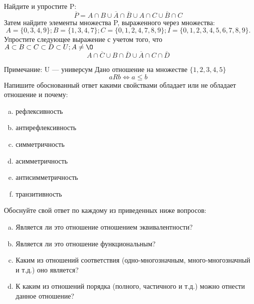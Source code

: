 \documentclass[10pt]{exam}
\begin{document}
\begin{questions}
\question
Найдите и упростите P:
\begin{equation*}
\overline{P} = A \cap B \cup \overline{A} \cap \overline{B} \cup A \cap C \cup \overline{B} \cap C
\end{equation*}
Затем найдите элементы множества P, выраженного через множества:
\begin{equation*}
A = \{0, 3, 4, 9\}; 
B = \{1, 3, 4, 7\};
C = \{0, 1, 2, 4, 7, 8, 9\};
I = \{0, 1, 2, 3, 4, 5, 6, 7, 8, 9\}.
\end{equation*}\question
Упростите следующее выражение с учетом того, что $A\subset B \subset C \subset D \subset U; A \neq \O$
\begin{equation*}
A \cap  \overline{C} \cup B \cap \overline{D} \cup  \overline{A} \cap C \cap  \overline{D}
\end{equation*}

Примечание: U — универсум\question
Дано отношение на множестве $\{1, 2, 3, 4, 5\}$ 
\begin{equation*}
aRb \iff a \leq b
\end{equation*}
Напишите обоснованный ответ какими свойствами обладает или не обладает отношение и почему:   
\begin{enumerate} [a)]\setcounter{enumi}{0}
\item рефлексивность
\item антирефлексивность
\item симметричность
\item асимметричность
\item антисимметричность
\item транзитивность
\end{enumerate}

Обоснуйте свой ответ по каждому из приведенных ниже вопросов:
\begin{enumerate} [a)]\setcounter{enumi}{0}
    \item Является ли это отношение отношением эквивалентности?
    \item Является ли это отношение функциональным?
    \item Каким из отношений соответствия (одно-многозначным, много-многозначный и т.д.) оно является?
    \item К каким из отношений порядка (полного, частичного и т.д.) можно отнести данное отношение?
\end{enumerate}



\end{questions}
\end{document}
